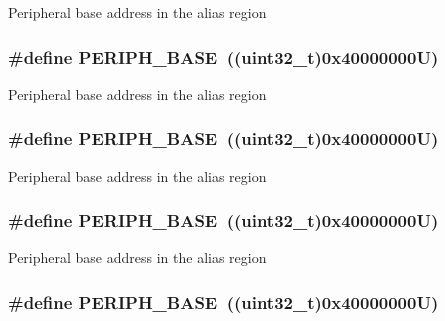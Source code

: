 Peripheral base address in the alias region \hypertarget{group___peripheral__memory__map_ga9171f49478fa86d932f89e78e73b88b0}{
\subsubsection[{P\-E\-R\-I\-P\-H\-\_\-\-B\-A\-S\-E}]{\setlength{\rightskip}{0pt plus 5cm}\#define P\-E\-R\-I\-P\-H\-\_\-\-B\-A\-S\-E~((uint32\-\_\-t)0x40000000\-U)}}\label{group___peripheral__memory__map_ga9171f49478fa86d932f89e78e73b88b0}
Peripheral base address in the alias region \hypertarget{group___peripheral__memory__map_ga9171f49478fa86d932f89e78e73b88b0}{
\subsubsection[{P\-E\-R\-I\-P\-H\-\_\-\-B\-A\-S\-E}]{\setlength{\rightskip}{0pt plus 5cm}\#define P\-E\-R\-I\-P\-H\-\_\-\-B\-A\-S\-E~((uint32\-\_\-t)0x40000000\-U)}}\label{group___peripheral__memory__map_ga9171f49478fa86d932f89e78e73b88b0}
Peripheral base address in the alias region \hypertarget{group___peripheral__memory__map_ga9171f49478fa86d932f89e78e73b88b0}{
\subsubsection[{P\-E\-R\-I\-P\-H\-\_\-\-B\-A\-S\-E}]{\setlength{\rightskip}{0pt plus 5cm}\#define P\-E\-R\-I\-P\-H\-\_\-\-B\-A\-S\-E~((uint32\-\_\-t)0x40000000\-U)}}\label{group___peripheral__memory__map_ga9171f49478fa86d932f89e78e73b88b0}
Peripheral base address in the alias region \hypertarget{group___peripheral__memory__map_ga9171f49478fa86d932f89e78e73b88b0}{
\subsubsection[{P\-E\-R\-I\-P\-H\-\_\-\-B\-A\-S\-E}]{\setlength{\rightskip}{0pt plus 5cm}\#define P\-E\-R\-I\-P\-H\-\_\-\-B\-A\-S\-E~((uint32\-\_\-t)0x40000000\-U)}}\label{group___peripheral__memory__map_ga9171f49478fa86d932f89e78e73b88b0}
